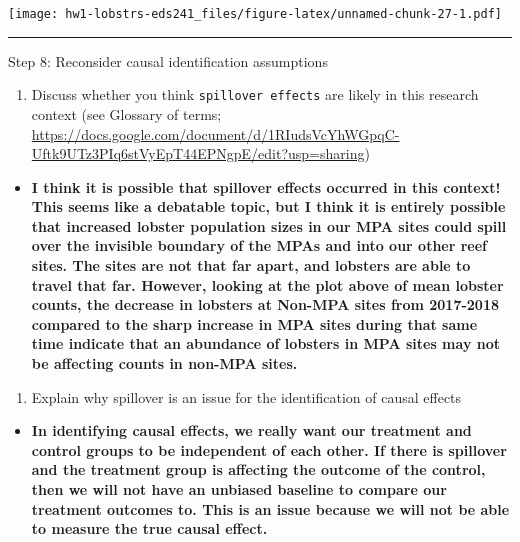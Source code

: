\documentclass[
]{article}
\providecommand{\tightlist}{%
  \setlength{\itemsep}{0pt}\setlength{\parskip}{0pt}}
\begin{document}
\texttt{[image: hw1-lobstrs-eds241\_files/figure-latex/unnamed-chunk-27-1.pdf]}

\begin{center}\rule{0.5\linewidth}{0.5pt}\end{center}

Step 8: Reconsider causal identification assumptions

\begin{enumerate}
\def\labelenumi{\alph{enumi}.}
\tightlist
\item
  Discuss whether you think \texttt{spillover\ effects} are likely in
  this research context (see Glossary of terms;
  \url{https://docs.google.com/document/d/1RIudsVcYhWGpqC-Uftk9UTz3PIq6stVyEpT44EPNgpE/edit?usp=sharing})
\end{enumerate}

\begin{itemize}
\tightlist
\item
  \textbf{I think it is possible that spillover effects occurred in this
  context! This seems like a debatable topic, but I think it is entirely
  possible that increased lobster population sizes in our MPA sites
  could spill over the invisible boundary of the MPAs and into our other
  reef sites. The sites are not that far apart, and lobsters are able to
  travel that far. However, looking at the plot above of mean lobster
  counts, the decrease in lobsters at Non-MPA sites from 2017-2018
  compared to the sharp increase in MPA sites during that same time
  indicate that an abundance of lobsters in MPA sites may not be
  affecting counts in non-MPA sites.}
\end{itemize}

\begin{enumerate}
\def\labelenumi{\alph{enumi}.}
\setcounter{enumi}{1}
\tightlist
\item
  Explain why spillover is an issue for the identification of causal
  effects
\end{enumerate}

\begin{itemize}
\tightlist
\item
  \textbf{In identifying causal effects, we really want our treatment
  and control groups to be independent of each other. If there is
  spillover and the treatment group is affecting the outcome of the
  control, then we will not have an unbiased baseline to compare our
  treatment outcomes to. This is an issue because we will not be able to
  measure the true causal effect.}
\end{itemize}
\end{document}

